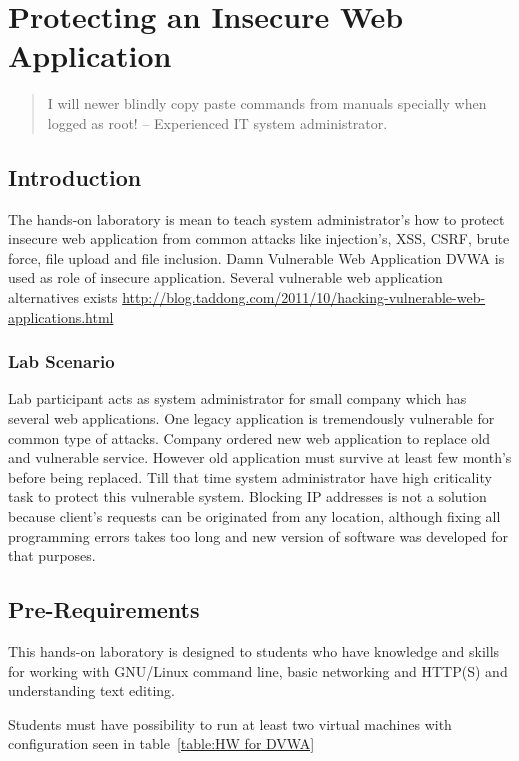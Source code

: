 \chapter{Protecting an Insecure Web Application}
\label{Protecting an Insecure Web Application}

\begin{quote}
I will newer blindly copy paste commands from manuals specially when logged as root! -- Experienced IT system administrator.
\end{quote}

\section{Introduction}

The hands-on laboratory is mean to teach system administrator's how to protect insecure web application from common attacks like injection's, \gls{XSS}, \gls{CSRF}, brute force, file upload and file inclusion. Damn Vulnerable Web Application \gls{DVWA} is used as role of insecure application. Several vulnerable web application  alternatives exists \url{http://blog.taddong.com/2011/10/hacking-vulnerable-web-applications.html}


\subsection{Lab Scenario}
Lab participant acts as system administrator for small company which has several web applications. One legacy application is tremendously vulnerable for common type of attacks. Company ordered new web application to replace old and vulnerable service. However old application must survive at least few month's before being replaced. Till that time system administrator have high criticality task  to protect this vulnerable system. Blocking IP addresses is not a solution because client's requests can be originated from any location, although fixing all programming errors takes too long and new version of software was developed for that purposes.



\section{Pre-Requirements}
This hands-on laboratory is designed to students who have knowledge and skills for working with GNU/Linux command line, basic networking and HTTP(S) and understanding text editing.
\par
Students must have possibility to run at least two virtual machines with configuration seen in table~\ref{table:HW for DVWA}

